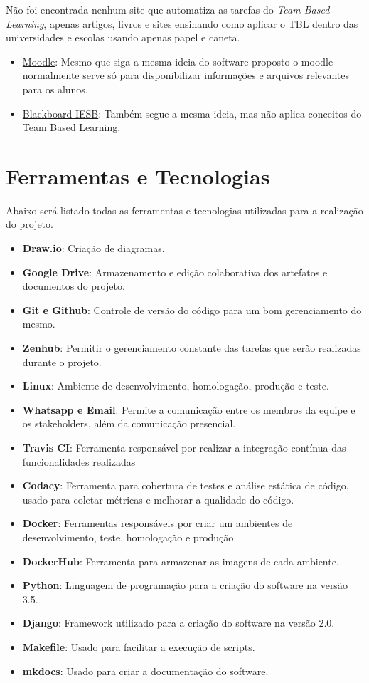 Não foi encontrada nenhum site que automatiza as tarefas do \textit{Team Based Learning}, apenas artigos, livros e sites ensinando como aplicar o TBL dentro das universidades e escolas usando apenas papel e caneta.

\begin{itemize}
  \item \href{https://aprender.unb.br/}{Moodle}: Mesmo que siga a mesma ideia do software proposto o moodle normalmente serve só para disponibilizar informações e arquivos relevantes para os alunos.
  \item \href{https://iesb.blackboard.com/}{Blackboard IESB}: Também segue a mesma ideia, mas não aplica conceitos do Team Based Learning.
\end{itemize}

\section{Ferramentas e Tecnologias}

Abaixo será listado todas as ferramentas e tecnologias utilizadas para a realização do projeto.

\begin{itemize}
  \item \textbf{Draw.io}: Criação de diagramas.
  \item \textbf{Google Drive}: Armazenamento e edição colaborativa dos artefatos e documentos do projeto.
  \item \textbf{Git e Github}: Controle de versão do código para um bom gerenciamento do mesmo.
  \item \textbf{Zenhub}: Permitir o gerenciamento constante das tarefas que serão realizadas durante o projeto.
  \item \textbf{Linux}: Ambiente de desenvolvimento, homologação, produção e teste.
  \item \textbf{Whatsapp e Email}: Permite a comunicação entre os membros da equipe e os stakeholders, além da
    comunicação presencial.
  \item \textbf{Travis CI}: Ferramenta responsável por realizar a integração contínua das funcionalidades realizadas
  \item \textbf{Codacy}: Ferramenta para cobertura de testes e análise estática de código, usado para coletar métricas e
    melhorar a qualidade do código.
  \item \textbf{Docker}: Ferramentas responsáveis por criar um ambientes de desenvolvimento, teste, homologação e produção
  \item \textbf{DockerHub}: Ferramenta para armazenar as imagens de cada ambiente.
  \item \textbf{Python}: Linguagem de programação para a criação do software na versão 3.5.
  \item \textbf{Django}: Framework utilizado para a criação do software na versão 2.0.
  \item \textbf{Makefile}: Usado para facilitar a execução de scripts.
  \item \textbf{mkdocs}: Usado para criar a documentação do software.
\end{itemize}

